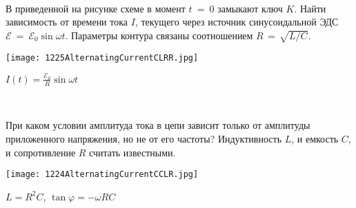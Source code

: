 \begin{ex}
\hspace{0pt} \\
\begin{minipage}{.65\textwidth}
В приведенной на рисунке схеме в момент $t$~=~0 замыкают ключ $K$. Найти зависимость от времени тока $I$, текущего через источник синусоидальной ЭДС $\mathcal{E}~=~\mathcal{E}_0 \sin \omega t$.
Параметры контура связаны соотношением $R\,=\,\sqrt{L/C}$.
\end{minipage}
\begin{minipage}{.35\textwidth}
\centering
\texttt{[image: 1225AlternatingCurrentCLRR.jpg]}
\end{minipage}
\begin{ans}
$I(t) = \frac{\mathcal{E}_0}{R} \sin \omega t$
\end{ans}
\end{ex}

\begin{ex}
\hspace{0pt} \\
\begin{minipage}{.65\textwidth}
При каком условии амплитуда тока в цепи зависит только от амплитуды приложенного напряжения, но не от его частоты? Индуктивность $L$, и емкость $C$, и сопротивление $R$ считать известными.
\end{minipage}
\begin{minipage}{.35\textwidth}
\centering
\texttt{[image: 1224AlternatingCurrentCCLR.jpg]}
\end{minipage}
\begin{ans}
$L=R^2C$, $\tan \varphi = -\omega RC$
\end{ans}
\end{ex}